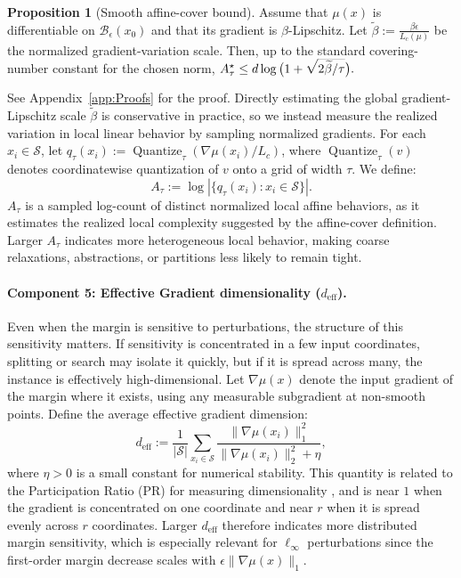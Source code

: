 \documentclass{article}
\theoremstyle{definition}
\newtheorem{proposition}[theorem]{Proposition}
\begin{document}
\begin{proposition}[Smooth affine-cover bound]\label{prop:beta_bound}
Assume that $\mu(x)$ is differentiable on $\mathcal B_\epsilon(x_0)$ and that its gradient is $\beta$-Lipschitz.
Let $\widetilde\beta:=\frac{\beta\epsilon}{L_c(\mu)}$ be the normalized gradient-variation scale. Then, up to the standard covering-number constant for the chosen norm,
$
   \smash{ A_\tau^\star\leq d\log
    \big( 1+\sqrt{\smash[b]{ {2\widetilde\beta}/{\tau}} } \big)
 }  .
$    
\end{proposition}
%
See Appendix~\ref{app:Proofs} for the proof. Directly estimating the global gradient-Lipschitz scale $\widetilde\beta$ is conservative in practice, so we instead measure the realized variation in local linear behavior by sampling normalized gradients. For each $x_i\in\mathcal S$, let
$q_\tau(x_i):=\operatorname{Quantize}_\tau(\nabla\mu(x_i)/L_c)$, where $\operatorname{Quantize}_\tau(v)$ denotes coordinatewise quantization of $v$ onto a grid of width $\tau$. We define:
\begin{equation}\label{eq:Atau_empirical}
    A_\tau := \log \left| \{q_\tau(x_i):x_i\in\mathcal S\}\right|.
\end{equation}
$A_\tau$ is a sampled log-count of distinct normalized local affine behaviors, as it estimates the realized local complexity suggested by the affine-cover definition. Larger $A_\tau$ indicates more heterogeneous local behavior, making coarse relaxations, abstractions, or partitions less likely to remain tight.

\paragraph{Component 5: Effective Gradient dimensionality ($d_\mathrm{eff}$).} 
Even when the margin is sensitive to perturbations, the structure of this sensitivity matters. If sensitivity is concentrated in a few input coordinates, splitting or search may isolate it quickly, but if it is spread across many, %
the instance is effectively high-dimensional. Let $\nabla \mu(x)$ denote the input gradient of the margin where it exists, using any measurable subgradient at non-smooth points. Define the average effective gradient dimension:
\begin{equation}
\label{eq:deff}
    d_{\mathrm{eff}}:= \frac{1}{|\mathcal S|} \sum_{x_i\in\mathcal S}\frac{ \|\nabla \mu(x_i)\|_1^2
    }{\|\nabla \mu(x_i)\|_2^2 + \eta} , 
\end{equation}
where $\eta>0$ is a small constant for numerical stability. This quantity is related to the Participation Ratio (PR) for measuring dimensionality \cite{Gao214262}, and is near $1$ when the gradient is concentrated on one coordinate and near $r$ when it is spread evenly across $r$ coordinates. Larger $d_{\mathrm{eff}}$ therefore indicates more distributed margin sensitivity, which is especially relevant for $\ell_\infty$ perturbations since the first-order margin decrease scales with $\epsilon\|\nabla\mu(x)\|_1$.
\end{document}
